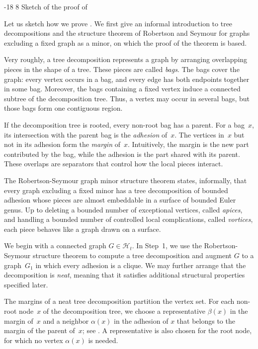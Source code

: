 \documentclass[1p,number,11pt]{elsarticle}
\makeatletter
\renewcommand\subsection{\@startsection{subsection}{2}{\z@}%
  {-18\p@ \@plus -4\p@ \@minus -4\p@}%
  {8\p@ \@plus 4\p@ \@minus 4\p@}%
  {\normalfont\normalsize\bfseries}}
\theoremstyle{plain}
\makeatother
\begin{document}
\subsection{Sketch of the proof of 
}

Let us sketch how we prove . 
We first give an informal introduction to tree decompositions and the structure theorem of Robertson and Seymour for graphs excluding a fixed graph as a minor, on which the proof of the theorem is based.

Very roughly, a tree decomposition represents a graph by arranging
overlapping pieces in the shape of a tree. These pieces are called
\emph{bags}. The bags cover the graph: every vertex occurs in a bag, and every
edge has both endpoints together in some bag. Moreover, the bags containing a
fixed vertex induce a connected subtree of the decomposition tree. Thus, a
vertex may occur in several bags, but those bags form one contiguous region.

If the decomposition tree is rooted, every non-root bag has a parent. For a
bag~$x$, its intersection with the parent bag is the \emph{adhesion} of~$x$.
The vertices in~$x$ but not in its adhesion form the \emph{margin} of~$x$.
Intuitively, the margin is the new part contributed by the bag, while the
adhesion is the part shared with its parent. These overlaps are separators
that control how the local pieces interact.

The Robertson-Seymour graph minor structure theorem states, informally, that
every graph excluding a fixed minor has a tree decomposition of bounded
adhesion whose pieces are almost embeddable in a surface of bounded Euler
genus. Up to deleting a bounded number of exceptional vertices, called
\emph{apices}, and handling a bounded number of controlled local
complications, called \emph{vortices}, each piece behaves like a graph drawn
on a surface.

We begin with a connected graph $G\in\mathscr H_t$. In Step~1, we use the
Robertson-Seymour structure theorem to compute a tree decomposition and
augment $G$ to a graph~$G_1$ in which every adhesion is a clique. We may
further arrange that the decomposition is \emph{neat}, meaning that it
satisfies additional structural properties specified later.

The margins of a neat tree decomposition partition the vertex set. For each
non-root node~$x$ of the decomposition tree, we choose a representative
$\beta(x)$ in the margin of~$x$ and a neighbor $\alpha(x)$ in the adhesion of
$x$ that belongs to the margin of the parent of~$x$; see
. A representative is also chosen for the root node, for
which no vertex $\alpha(x)$ is needed.
\end{document}
